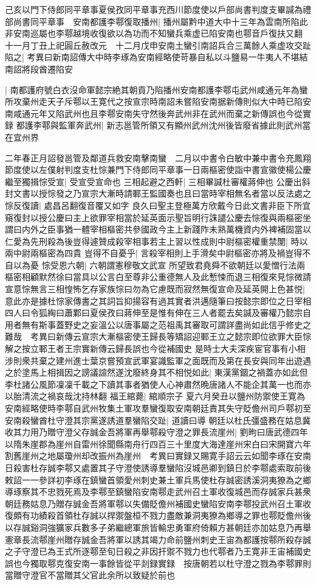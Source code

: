 己亥以門下侍郎同平章事夏侯孜同平章事充西川節度使以戶部尚書判度支畢諴為禮部尚書同平章事　安南都護李鄠復取播州|{
	播州屬黔中道大中十三年為雲南所陷此非安南巡屬也李鄠越境收復欲以為功而不知蠻兵乘虚已陷安南也鄠音戶復扶又翻}
十一月丁丑上祀圓丘赦改元　十二月戊申安南土蠻引南詔兵合三萬餘人乘虚攻交趾陷之|{
	考異曰新南詔傳大中時李琢為安南經略使苛暴自私以斗鹽易一牛夷人不堪結南詔將段酋遷陷安}


|{
	南都護府號白衣沒命軍懿宗絶其朝貢乃陷播州安南都護李鄠屯武州咸通元年為蠻所攻棄州走天子斥鄠以王寛代之按宣宗時南詔未嘗陷安南据新傳則似大中時已陷安南咸通元年又陷武州也且李鄠安南失守然後奔武州非在武州而棄之新傳誤也今從實録}
都護李鄠與監軍奔武州|{
	新志邕管所領又有顯州武州沈州後皆廢省據此則武州當在宜州界}


二年春正月詔發邕管及鄰道兵救安南擊南蠻　二月以中書令白敏中兼中書令充鳳翔節度使以左僕射判度支杜悰兼門下侍郎同平章事一日兩樞密使詣中書宣徽使楊公慶繼至獨揖悰受宣|{
	受宣受宣命也}
三相起避之西軒|{
	三相畢諴杜審權蔣伸也}
公慶出斜封文書以授悰發之乃宣宗大漸時請鄆王監國奏也且曰當時宰相無名者當以反法處之悰反復讀|{
	處昌呂翻復音覆又如字}
良久曰聖主登極萬方欣戴今日此文書非臣下所宜窺復封以授公慶曰主上欲罪宰相當於延英面示聖旨明行誅譴公慶去悰復與兩樞密坐謂曰内外之臣事猶一體宰相樞密共參國政今主上新踐阼未熟萬機資内外裨補固當以仁愛為先刑殺為後豈得遽贊成殺宰相事若主上習以性成則中尉樞密權重禁闈|{
	時以兩中尉兩樞密為四貴}
豈得不自憂乎|{
	言殺宰相則上手滑矣中尉樞密亦將及禍豈得不自以為憂}
悰受恩六朝|{
	六朝謂憲穆敬文武宣}
所望致君堯舜不欲朝廷以愛憎行法兩樞密相顧默然徐曰當具以公言白至尊非公重德無人及此慙悚而退三相復來見悰微請宣意悰無言三相惶怖乞存家族悰曰勿為它慮既而寂然無復宣命及延英開上色甚悦|{
	意此亦是據杜悰家傳書之其詞旨抑揚容有過其實者洪邁隨筆曰按懿宗即位之日宰相四人曰令狐綯曰蕭鄴曰夏侯孜曰蔣伸至是惟有伸在三人者罷去矣諴及審權乃懿宗自用者無有斯事蓋野史之妄溫公以唐事屬之范祖禹其審取可謂詳盡尚如此信乎修史之難哉　考異曰新傳云宣宗大漸樞密使王歸長等矯詔迎鄆王立之懿宗即位欲罪大臣悰解之按立鄆王者王宗實新傳云歸長誤也今從補國史}
是時士大夫深疾宦官事有小相涉則衆共棄之建州進士葉京嘗預宣武軍宴識監軍之面既而及第在長安與同年出遊遇之於塗馬上相揖因之謗議諠然遂沈廢終身其不相悦如此|{
	東漢黨錮之禍蓋亦如此但李杜諸公風節凜凜千載之下讀其事者猶使人心神肅然晩唐諸人不能企其萬一也而亦以胎清流之禍哀哉沈持林翻}
福王綰薨|{
	綰順宗子}
夏六月癸丑以鹽州防禦使王寛為安南經略使時李鄠自武州牧集土軍攻羣蠻復取安南朝廷責其失守貶儋州司戶鄠初至安南殺蠻酋杜守澄其宗黨遂誘道羣蠻陷交趾|{
	道讀曰導}
朝廷以杜氏彊盛務在姑息冀收其力用乃贈守澄父存誠金吾將軍再舉鄠殺守澄之罪長流崖州|{
	劉昫曰唐武德四年以隋朱崖郡為崖州自雷州徐聞縣南舟行四百三十里度大海達崖州宋白曰宋開寶六年割舊崖州之地屬瓊州却改振州為崖州　考異曰實録又賜寛手詔云云如聞李琢在安南日殺害杜存誠李鄠又處置其子守澄使誘導羣蠻陷沒城邑卿到鎮日於李鄠處索取前後敕詔一一參詳初李琢在鎮蠻首領愛州刺史兼土軍兵馬使杜存誠密誘溪洞夷獠為之鄉導琢察其不忠戮死焉及李鄠至鎮蠻陷安南鄠走武州召土軍收復城邑而存誠家兵甚衆朝廷務姑息乃贈存誠金吾將軍鄠以失備貶儋州補國史蠻陷安南李鄠投武州召土軍收復頗有功績殺首領杜存誠以捍禦盤桓不戮力盡敵兼洞夷獠為鄉導之罪也鄠貶儋州後以存誠谿洞強獷家兵數多子弟繼總軍旅皆輸忠勇軍府倚賴方甚朝廷亦加姑息乃再舉憲章長流鄠崖州贈存誠金吾將軍以誘其竭力命前鹽州刺史王宙為都護按鄠所殺存誠之子守澄已為王式所逐鄠至旬日殺之非因扞禦不戮力也代鄠者乃王寛非王宙補國史誤也今獨取鄠克復安南一事餘皆從平剡録實録　按唐朝若以杜守澄之戮為李鄠罪則當贈守澄官不當贈其父官此余所以致疑於前也}
